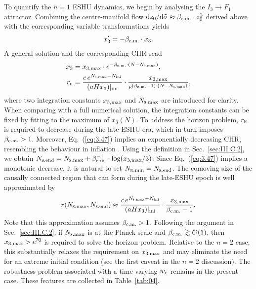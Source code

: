 \documentclass[aps,prd,twocolumn]{revtex4-2}
\newcommand\dx{{\rm d}}
\newcommand\subcm{{\rm c.m.}}
\newcommand\subF{\textsc{f}}
\newcommand\subH{\textsc{h}}
\newcommand\subini{{\rm ini}}
\newcommand\subRmin{{\rm \textsc{r}.min}}
\newcommand\subSmax{{\rm \textsc{s}.max}}
\newcommand\subSend{{\rm \textsc{s}.end}}
\newcommand\submax{{\rm max}}
\begin{document}
To quantify the $n=1$ ESHU dynamics, we begin by analysing the $I_3\rightarrow F_1$ attractor. Combining the centre-manifold flow $\dx z_0/\dx\tilde{\sigma}\approx\beta_\subcm\cdot z_0^2$ derived above with the corresponding variable transformations yields
\begin{equation}
  x_3^\prime = - \beta_\subcm\cdot x_3.
\end{equation}
A general solution and the corresponding CHR read
\begin{align}
  x_3 &= x_{3,\submax} \cdot e^{-\beta_\subcm\cdot(N-N_\subSmax)}, \label{eq:3.46}\\
  r_\subH &= \frac{c\,e^{N_\subSmax-N_\subini}}{(aHx_3)|_\subini} \cdot \frac{x_{3,\submax}}{e^{(\beta_\subcm-1)\cdot(N-N_\subSmax)}}, \label{eq:3.47}
\end{align}
where two integration constants $x_{3,\submax}$ and $N_\subSmax$ are introduced for clarity. When comparing with a full numerical solution, the integration constants can be fixed by fitting to the maximum of $x_3(N)$. To address the horizon problem, $r_\subH$ is required to decrease during the late-ESHU era, which in turn imposes $\beta_\subcm>1$. Moreover, Eq.~(\ref{eq:3.47}) implies an exponentially decreasing CHR, resembling the behaviour in inflation \cite{Guth1981.PRD.23.347}. Using the definition in Sec.~\ref{sec:III.C.2}, we obtain $N_\subSend = N_\subSmax + \beta_\subcm^{-1}\cdot\log(x_{3,\submax}/3)$. Since Eq.~(\ref{eq:3.47}) implies a monotonic decrease, it is natural to set $N_\subRmin=N_\subSend$. The comoving size of the causally connected region that can form during the late-ESHU epoch is well approximated by
\begin{equation}
  r(N_\subSmax,N_\subSend) \approx \frac{c\,e^{N_\subSmax-N_\subini}}{(aHx_3)|_\subini} \cdot \frac{x_{3,\submax}}{\beta_\subcm-1}.
\end{equation}
Note that this approximation assumes $\beta_\subcm>1$. Following the argument in Sec.~\ref{sec:III.C.2}, if $N_\subSmax$ is at the Planck scale and $\beta_\subcm\gtrsim\mathcal{O}(1)$, then $x_{3,\submax}>e^{70}$ is required to solve the horizon problem. Relative to the $n=2$ case, this substantially relaxes the requirement on $x_{3,\submax}$ and may eliminate the need for an extreme initial condition (see the first caveat in the $n=2$ discussion). The robustness problem associated with a time-varying $w_\subF$ remains in the present case. These features are collected in Table~\ref{tab:04}.
\end{document}
